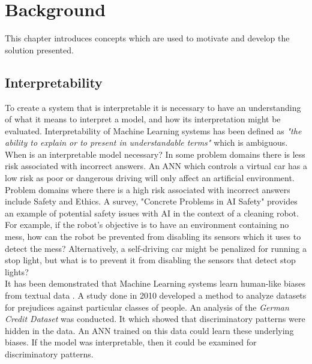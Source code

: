 \chapter{Background}\label{C:backgroundsurvey}
This chapter introduces concepts which are used to motivate and develop the solution presented.

\section{Interpretability}
To create a system that is interpretable it is necessary to have an understanding of what it means to interpret a model, and how its interpretation might be evaluated. Interpretability of Machine Learning systems has been defined as \textit{"the ability to explain or to present in understandable terms"} \cite{doshi2017towards} which is ambiguous.\\

When is an interpretable model necessary? \cite{doshi2017towards} In some problem domains there is less risk associated with incorrect answers. An ANN which controls a virtual car has a low risk as poor or dangerous driving will only affect an artificial environment. Problem domains where there is a high risk associated with incorrect answers include Safety and Ethics. A survey, "Concrete Problems in AI Safety" \cite{amodei2016concrete} provides an example of potential safety issues with AI in the context of a cleaning robot.  For example, if the robot's objective is to have an environment containing no mess, how can the robot be prevented from disabling its sensors which it uses to detect the mess? Alternatively, a self-driving car might be penalized for running a stop light, but what is to prevent it from disabling the sensors that detect stop lights?\\

It has been demonstrated that Machine Learning systems learn human-like biases from textual data \cite{caliskan2017semantics}. A study done in 2010 \cite{ruggieri2010data} developed a method to analyze datasets for prejudices against particular classes of people. An analysis of the \textit{German Credit Dataset} was conducted. It which showed that discriminatory patterns were hidden in the data. An ANN trained on this data could learn these underlying biases. If the model was interpretable, then it could be examined for discriminatory patterns.\\

